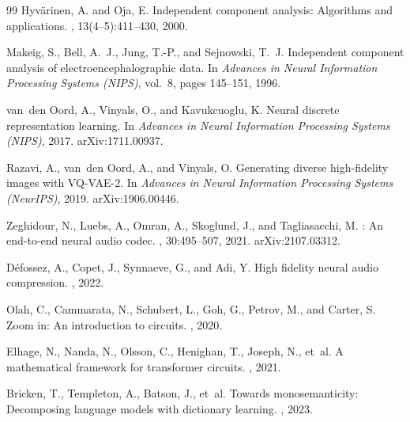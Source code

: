 \documentclass[11pt]{article}
\begin{document}
\begin{thebibliography}{99}
Hyv\"arinen, A. and Oja, E.
\newblock Independent component analysis: Algorithms and applications.
, 13(4--5):411--430, 2000.

Makeig, S., Bell, A.~J., Jung, T.-P., and Sejnowski, T.~J.
\newblock Independent component analysis of electroencephalographic data.
\newblock In {\em Advances in Neural Information Processing Systems
(NIPS)}, vol.~8, pages 145--151, 1996.


van~den Oord, A., Vinyals, O., and Kavukcuoglu, K.
\newblock Neural discrete representation learning.
\newblock In {\em Advances in Neural Information Processing Systems
(NIPS)}, 2017. arXiv:1711.00937.

Razavi, A., van~den Oord, A., and Vinyals, O.
\newblock Generating diverse high-fidelity images with {VQ-VAE-2}.
\newblock In {\em Advances in Neural Information Processing Systems
(NeurIPS)}, 2019. arXiv:1906.00446.

Zeghidour, N., Luebs, A., Omran, A., Skoglund, J., and Tagliasacchi, M.
: An end-to-end neural audio codec.
, 30:495--507, 2021. arXiv:2107.03312.

D\'efossez, A., Copet, J., Synnaeve, G., and Adi, Y.
\newblock High fidelity neural audio compression.
, 2022.


Olah, C., Cammarata, N., Schubert, L., Goh, G., Petrov, M., and Carter, S.
\newblock Zoom in: An introduction to circuits.
, 2020.

Elhage, N., Nanda, N., Olsson, C., Henighan, T., Joseph, N., et~al.
\newblock A mathematical framework for transformer circuits.
, 2021.


Bricken, T., Templeton, A., Batson, J., et~al.
\newblock Towards monosemanticity: Decomposing language models with
dictionary learning.
, 2023.


\end{thebibliography}
\end{document}
